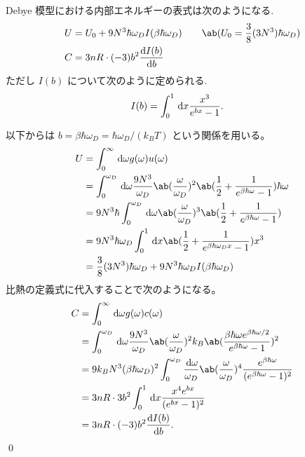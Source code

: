 \documentclass[uplatex,diffipdfmx,a4paper,11pt]{jlreq}
\makeatletter
\numberwithin{equation}{section}
\theoremstyle{definition}
\renewenvironment{proof}[1][\proofname]{\par
  \normalfont
  \topsep6\p@\@plus6\p@ \trivlist
  \item[\hskip\labelsep{\bfseries #1}\@addpunct{\bfseries}]\ignorespaces\quad\par
}{%
  \qed\endtrivlist\@endpefalse
}
\renewcommand\proofname{証明}
\makeatother
\begin{document}
\begin{theorem}
  Debye 模型における内部エネルギーの表式は次のようになる.
  \begin{align}
    U & = U_0 + 9N^3\hbar\omega_DI(\beta\hbar\omega_D) \qquad \ab(U_0 = \frac{3}{8}(3N^3)\hbar\omega_D) \\
    C & = 3nR\cdot(-3)b^2\diff{I(b)}{b}
  \end{align}
  ただし $I(b)$ について次のように定められる.
  \begin{align}
    I(b) & = \int_0^1\dl{x}\frac{x^3}{e^{bx} - 1}.
  \end{align}
\end{theorem}
\begin{proof}
  以下からは $b = \beta\hbar\omega_D = \hbar\omega_D/(k_BT)$ という関係を用いる。
  \begin{align}
    U & = \int_0^\infty\dl{\omega}g(\omega)u(\omega)                                                                                                      \\
      & = \int_0^{\omega_D}\dl{\omega}\frac{9N^3}{\omega_D}\ab(\frac{\omega}{\omega_D})^2\ab(\frac{1}{2} + \frac{1}{e^{\beta\hbar\omega} - 1})\hbar\omega \\
      & = 9N^3\hbar\int_0^{\omega_D}\dl{\omega}\ab(\frac{\omega}{\omega_D})^3\ab(\frac{1}{2} + \frac{1}{e^{\beta\hbar\omega} - 1})                        \\
      & = 9N^3\hbar\omega_D\int_0^1\dl{x}\ab(\frac{1}{2} + \frac{1}{e^{\beta\hbar\omega_Dx} - 1})x^3                                                      \\
      & = \frac{3}{8}(3N^3)\hbar\omega_D + 9N^3\hbar\omega_DI(\beta\hbar\omega_D)
  \end{align}
  比熱の定義式に代入することで次のようになる。
  \begin{align}
    C & = \int_0^\infty\dl{\omega}g(\omega)c(\omega)                                                                                                                         \\
      & = \int_0^{\omega_D}\dl{\omega}\frac{9N^3}{\omega_D}\ab(\frac{\omega}{\omega_D})^2k_B\ab(\frac{\beta\hbar\omega e^{\beta\hbar\omega/2}}{e^{\beta\hbar\omega} - 1})^2  \\
      & = 9k_BN^3(\beta\hbar\omega_D)^2\int_0^{\omega_D}\frac{\dl{\omega}}{\omega_D}\ab(\frac{\omega}{\omega_D})^4\frac{ e^{\beta\hbar\omega}}{(e^{\beta\hbar\omega} - 1)^2} \\
      & = 3nR\cdot 3b^2\int_0^1\dl{x}\frac{x^4e^{bx}}{(e^{bx} - 1)^2}                                                                                                        \\
      & = 3nR\cdot (-3)b^2\diff{I(b)}{b}.
  \end{align}
\end{proof}
\end{document}
